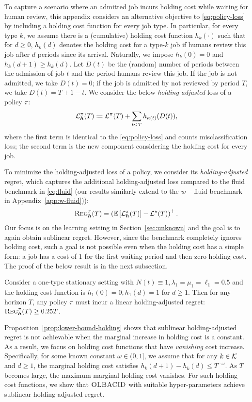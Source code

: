To capture a scenario where an admitted job incurs holding cost while waiting for human review, this appendix considers an alternative objective to \eqref{eq:policy-loss} by including a holding cost function for every job type. In particular, for every type $k$, we assume there is a (cumulative) holding cost function $h_k(\cdot)$ such that for $d \geq 0$, $h_k(d)$ denotes the holding cost for a type-$k$ job if humans review this job after $d$ periods since its arrival. Naturally, we impose $h_k(0) = 0$ and $h_k(d + 1) \geq h_k(d)$.  Let $D(t)$ be the (random) number of periods between the admission of job $t$ and the period humans review this job. If the job is not admitted, we take $D(t) = 0$; if the job is admitted by not reviewed by period $T$, we take $D(t) = T + 1 - t$. We consider the below \emph{holding-adjusted} loss of a policy $\pi$:
\begin{equation}\label{eq:holding-loss}
\mathcal{L}_{\boldsymbol{h}}^{\pi}(T) \coloneqq \mathcal{L}^{\pi}(T) + \sum_{t \leq T} h_{\kappa(t)}(D(t)),
\end{equation}
where the first term is identical to the \eqref{eq:policy-loss} and counts misclassification loss; the second term is the new component considering the holding cost for every job.

To minimize the holding-adjusted loss of a policy, we consider its \emph{holding-adjusted} regret, which captures the additional holding-adjusted loss compared to the fluid benchmark in \eqref{eq:fluid} (our results similarly extend to the $w-$fluid benchmark in Appendix~\ref{app:w-fluid})): 
\begin{equation}
\textsc{Reg}_{\boldsymbol{h}}^{\pi}(T) = \left(\mathbb E\left[\mathcal{L}_{\boldsymbol{h}}^{\pi}(T)\right] - \mathcal{L}^\star(T)\right)^+.
\end{equation}
Our focus is on the learning setting in Section~\ref{sec:unknown} and the goal is to again obtain sublinear regret. However, since the benchmark completely ignores holding cost, such a goal is not possible even when the holding cost has a simple form: a job has a cost of $1$ for the first waiting period and then zero holding cost. The proof of the below result is in the next subsection.
\begin{proposition}\label{prop:lower-bound-holding}
Consider a one-type stationary setting with $N(t) \equiv 1, \lambda_1 = \mu_1 = \ell_1=0.5$ and the holding cost function is $h_1(0) = 0, h_1(d) = 1$ for $d \geq 1$. Then for any horizon $T$, any policy $\pi$ must incur a linear holding-adjusted regret: $\textsc{Reg}_{\boldsymbol{h}}^{\pi}(T) \geq 0.25T$.
\end{proposition}
Proposition~\ref{prop:lower-bound-holding} shows that sublinear holding-adjusted regret is not achievable when the marginal increase in holding cost is a constant. As a result, we focus on holding cost functions that have \emph{vanishing} cost increase. Specifically, for some known constant $\omega \in (0,1]$, we assume that for any $k \in \mathcal{K}$ and $d \geq 1$, the marginal holding cost satisfies $h_k(d+1) - h_k(d) \leq T^{-\omega}$. As $T$ becomes large, the maximum marginal holding cost vanishes. For such holding cost functions, we show that $\textsc{OLBACID}$ with suitable hyper-parameters achieve sublinear holding-adjusted regret.

